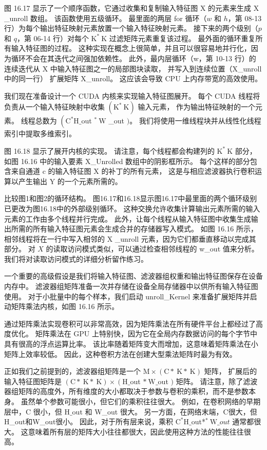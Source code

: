 图 16.17 显示了一个顺序函数，它通过收集和复制输入特征图 $\mathrm{X}$ 的元素来生成 $\mathrm{X}$ \_unroll 数组。 
该函数使用五级循环。 最里面的两层 for 循环（$w$ 和 $h$，第 08-13 行）为每个输出特征映射元素放置一个输入特征映射元素。 
接下来的两个级别（$p$ 和 $q$，第 06-14 行）对每个 $\mathrm{K}^{*} \mathrm{~K}$ 过滤矩阵元素重复该过程。 
最外面的循环重复所有输入特征图的过程。 这种实现在概念上很简单，并且可以很容易地并行化，因为循环不会在其迭代之间强加依赖性。 
此外，最内层循环（w，第 10-13 行）的连续迭代从 $\mathrm{X}$ 中输入特征图之一的局部图块读取，
并写入到连续位置（X\_unroll 中的同一行） 扩展矩阵 X\_unroll。 这应该会导致 CPU 上内存带宽的高效使用。

我们现在准备设计一个 CUDA 内核来实现输入特征图展开。 
每个 CUDA 线程将负责从一个输入特征映射中收集 $\left(\mathrm{K}^{*} \mathrm{~K}\right)$ 输入元素，
作为输出特征映射的一个元素。 
线程总数为 $\left(\mathrm{C}^{*} \mathrm{H} \_\right.$out ${ }^{*} \mathrm{~W}$ \_out $) $。 
我们将使用一维线程块并从线性化线程索引中提取多维索引。

图 16.18 显示了展开内核的实现。 请注意，每个线程都会构建列的 $\mathrm{K}^{*} \mathrm{~K}$ 部分，
如图 16.16 中的输入要素 X\_Unrolled 数组中的阴影框所示。 
每个这样的部分包含来自通道 $\mathrm{c}$ 的输入特征图 $\mathrm{X}$ 的补丁的所有元素，
这是与相应滤波器执行卷积运算以产生输出 Y 的一个元素所需的。

比较图1和图2的循环结构。 图16.17和16.18显示图16.17中最里面的两个循环级别已更改为图16.18中的外部级别循环。 
这种交换允许收集计算输出元素所需的输入元素的工作由多个线程并行完成。 
此外，让每个线程从输入特征图中收集生成输出所需的所有输入特征图元素会生成合并的存储器写入模式。 
如图 16.16 所示，相邻线程将在一行中写入相邻的 $\mathrm{X}$ \_unroll 元素，因为它们都垂直移动以完成其部分。 
对 $X$ 的读取访问模式类似，可以通过检查相邻线程的 w\_out 值来分析。 我们将对读取访问模式的详细分析留作练习。

一个重要的高级假设是我们将输入特征图、滤波器组权重和输出特征图保存在设备内存中。 
滤波器组矩阵准备一次并存储在设备全局存储器中以供所有输入特征图使用。 
对于小批量中的每个样本，我们启动 unroll\_Kernel 来准备扩展矩阵并启动矩阵乘法内核，如图 16.16 所示。

通过矩阵乘法实现卷积可以非常高效，因为矩阵乘法在所有硬件平台上都经过了高度优化。 
矩阵乘法在 GPU 上特别快，因为它在全局内存数据访问的每个字节中具有很高的浮点运算比率。 
该比率随着矩阵变大而增加，这意味着矩阵乘法在小矩阵上效率较低。 因此，这种卷积方法在创建大型乘法矩阵时最为有效。

正如我们之前提到的，滤波器组矩阵是一个 $\mathrm{M} \times(\mathrm{C} * \mathrm{~K} * \mathrm{~K})$ 矩阵，
扩展后的输入特征图矩阵是 $(\mathrm{C} * \mathrm{~K} * \mathrm{~K}) \times\left(\mathrm{H} \_\right.$out $* \mathrm{~W} \_ $out $)$ 矩阵。 
请注意，除了滤波器组矩阵的高度外，所有维度的大小都取决于参数与卷积的乘积，而不是参数本身。 
虽然单个参数可能很小，但它们的乘积往往很大。 
例如，在卷积网络的早期层中，$\mathrm{C}$ 很小，但 $\mathrm{H} \_$out 和 W\_out 很大。 
另一方面，在网络末端，$\mathrm{C}$很大，但H\_out和W\_out很小。 
因此，对于所有层来说，乘积 $\mathrm{C}^{*} \mathrm{H} \_$out*${ }^{*} \mathrm{~W} \_o u t$ 通常都很大。 
这意味着所有层的矩阵大小往往都很大，因此使用这种方法的性能往往很高。

